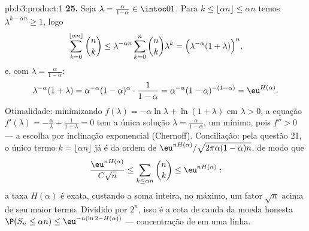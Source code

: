 \begin{solution}{pb:b3:product:1}
\textbf{25.} Seja $\lambda = \frac{\alpha}{1-\alpha} \in
\intoc01$. Para $k \leq \lfloor\alpha n\rfloor \leq \alpha n$
temos $\lambda^{k - \alpha n} \geq 1$, logo
\[
\sum_{k=0}^{\lfloor\alpha n\rfloor}\binom nk
\leq \lambda^{-\alpha n}\sum_{k=0}^{n}\binom nk\lambda^{k}
= \Bigl(\lambda^{-\alpha}(1 + \lambda)\Bigr)^{n},
\]
e, com $\lambda = \frac\alpha{1-\alpha}$:
\[
\lambda^{-\alpha}(1+\lambda)
= \alpha^{-\alpha}(1-\alpha)^{\alpha}\cdot\frac1{1-\alpha}
= \alpha^{-\alpha}(1-\alpha)^{-(1-\alpha)}
= \eu^{H(\alpha)} .
\]
Otimalidade: minimizando $f(\lambda) = -\alpha\ln\lambda +
\ln(1+\lambda)$ em $\lambda > 0$, a equação $f'(\lambda)
= -\frac\alpha\lambda + \frac1{1+\lambda} = 0$ tem a única
solução $\lambda = \frac\alpha{1-\alpha}$, um mínimo, pois
$f'' > 0$ --- a escolha por inclinação exponencial (Chernoff).
Conciliação: pela questão 21, o único termo $k =
\lfloor\alpha n\rfloor$ já é da ordem de
$\eu^{nH(\alpha)}/\sqrt{2\pi\alpha(1-\alpha)n}$, de modo que
\[
\frac{\eu^{nH(\alpha)}}{C\sqrt n} \leq
\sum_{k\leq\alpha n}\binom nk \leq \eu^{nH(\alpha)} :
\]
a taxa $H(\alpha)$ é exata, custando a soma inteira, no máximo,
um fator $\sqrt n$ acima de seu maior termo. Dividido por $2^n$,
isso é a cota de cauda da moeda honesta $\P(S_n \leq \alpha n) \leq
\eu^{-n(\ln2 - H(\alpha))}$ --- concentração de  em
uma linha.
\end{solution}

